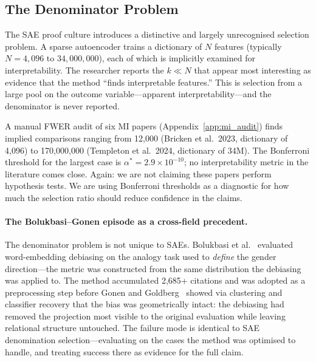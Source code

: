 \documentclass{article}
\begin{document}
\subsection{The Denominator Problem}
\label{sec:denominator}

The SAE proof culture introduces a distinctive and largely unrecognised selection problem. A sparse autoencoder trains a dictionary of $N$ features (typically $N = 4{,}096$ to $34{,}000{,}000$), each of which is implicitly examined for interpretability. The researcher reports the $k \ll N$ that appear most interesting as evidence that the method ``finds interpretable features.'' This is selection from a large pool on the outcome variable---apparent interpretability---and the denominator is never reported.

A manual FWER audit of six MI papers (Appendix~\ref{app:mi_audit}) finds implied comparisons ranging from 12,000 (Bricken et al.~2023, dictionary of 4,096) to 170,000,000 (Templeton et al.~2024, dictionary of 34M). The Bonferroni threshold for the largest case is $\alpha^* = 2.9 \times 10^{-10}$; no interpretability metric in the literature comes close. Again: we are not claiming these papers perform hypothesis tests. We are using Bonferroni thresholds as a diagnostic for how much the selection ratio should reduce confidence in the claims.

\paragraph{The Bolukbasi--Gonen episode as a cross-field precedent.} The denominator problem is not unique to SAEs. Bolukbasi et al.~\citep{bolukbasi_man_2016} evaluated word-embedding debiasing on the analogy task used to \textit{define} the gender direction---the metric was constructed from the same distribution the debiasing was applied to. The method accumulated 2,685+ citations and was adopted as a preprocessing step before Gonen and Goldberg~\citep{gonen_lipstick_2019} showed via clustering and classifier recovery that the bias was geometrically intact: the debiasing had removed the projection most visible to the original evaluation while leaving relational structure untouched. The failure mode is identical to SAE denomination selection---evaluating on the cases the method was optimised to handle, and treating success there as evidence for the full claim.
\end{document}
